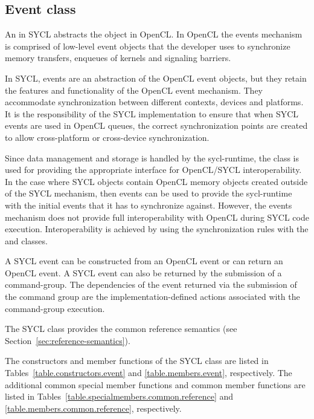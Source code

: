 \subsection{Event class}

An  in SYCL abstracts the  object in OpenCL. In
OpenCL the events mechanism is comprised of low-level event objects that
the developer uses to synchronize memory transfers,
enqueues of kernels and signaling barriers.

In SYCL, events are an abstraction of the OpenCL event objects, but they
retain the features and functionality of the OpenCL event mechanism. They
accommodate synchronization between different contexts, devices and platforms.
It is the responsibility of the SYCL implementation to ensure that when SYCL
events are used in OpenCL queues, the correct synchronization points are
created to allow cross-platform or cross-device synchronization.

Since data management and storage is handled by the \gls{sycl-runtime}, the
 class is used for providing the appropriate interface for
OpenCL/SYCL interoperability. In the case where SYCL objects contain
OpenCL memory objects created outside of the SYCL mechanism, then events
can be used to provide the \gls{sycl-runtime} with the initial events that it has
to synchronize against. However, the events mechanism does not provide
full interoperability with OpenCL during SYCL code execution.
Interoperability is achieved by using the synchronization rules with the
 and  classes.

A SYCL event can be constructed from an OpenCL event or can return an OpenCL
event.
A SYCL event can also be returned by the submission of a \gls{command-group}.
The dependencies of the event returned via the submission of the command group
are the implementation-defined actions associated with the \gls{command-group}
execution. 

The SYCL  class provides the common reference semantics
(see Section~\ref{sec:reference-semantics}).

The constructors and member functions of the SYCL  class are listed in Tables~\ref{table.constructors.event} and \ref{table.members.event}, respectively. The additional common special member functions and common member functions are listed in Tables~\ref{table.specialmembers.common.reference} and \ref{table.members.common.reference}, respectively.


